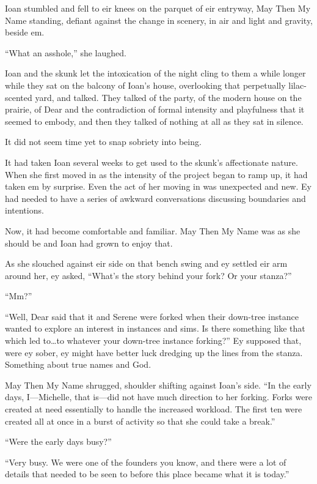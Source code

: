 Ioan stumbled and fell to eir knees on the parquet of eir entryway, May Then My Name standing, defiant against the change in scenery, in air and light and gravity, beside em.

``What an asshole,'' she laughed.

Ioan and the skunk let the intoxication of the night cling to them a while longer while they sat on the balcony of Ioan's house, overlooking that perpetually lilac-scented yard, and talked. They talked of the party, of the modern house on the prairie, of Dear and the contradiction of formal intensity and playfulness that it seemed to embody, and then they talked of nothing at all as they sat in silence.

It did not seem time yet to snap sobriety into being.

It had taken Ioan several weeks to get used to the skunk's affectionate nature. When she first moved in as the intensity of the project began to ramp up, it had taken em by surprise. Even the act of her moving in was unexpected and new. Ey had needed to have a series of awkward conversations discussing boundaries and intentions.

Now, it had become comfortable and familiar. May Then My Name was as she should be and Ioan had grown to enjoy that.

As she slouched against eir side on that bench swing and ey settled eir arm around her, ey asked, ``What's the story behind your fork? Or your stanza?''

``Mm?''

``Well, Dear said that it and Serene were forked when their down-tree instance wanted to explore an interest in instances and sims. Is there something like that which led to\ldots to whatever your down-tree instance forking?'' Ey supposed that, were ey sober, ey might have better luck dredging up the lines from the stanza. Something about true names and God.

May Then My Name shrugged, shoulder shifting against Ioan's side. ``In the early days, I---Michelle, that is---did not have much direction to her forking. Forks were created at need essentially to handle the increased workload. The first ten were created all at once in a burst of activity so that she could take a break.''

``Were the early days busy?''

``Very busy. We were one of the founders you know, and there were a lot of details that needed to be seen to before this place became what it is today.''

